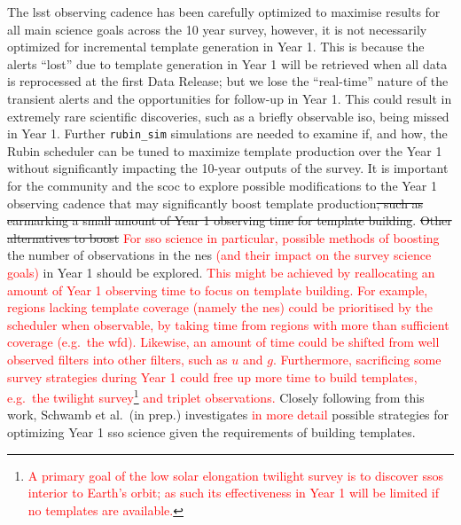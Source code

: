 \documentclass[preprintm,linenumbers]{aastex631}
\newcommand{\rubinsim}{\texttt{rubin\_sim}\xspace}
\providecommand{\red}[1]{\textcolor{red}{#1}}
\begin{document}
The \gls*{lsst} observing cadence has been carefully optimized to maximise results for all main science goals across the 10 year survey, however, it is not necessarily optimized for incremental template generation in Year 1.
  This is because the alerts ``lost'' due to template generation in Year 1 will be retrieved when all data is reprocessed at the first Data Release; but we lose the ``real-time'' nature of the transient alerts and the opportunities for follow-up in Year 1.
This could result in extremely rare scientific discoveries, such as a briefly observable \gls*{iso}, being missed in Year 1.
		Further \rubinsim simulations are needed to examine if, and how, the Rubin scheduler can be tuned to maximize template production over the Year 1 without significantly impacting the 10-year outputs of the survey. 
  It is important for the community and the \gls*{scoc} to explore possible modifications to the Year 1 observing cadence  that may significantly boost template production\sout{, such as earmarking a small amount of Year 1 observing time for template building}. 
\sout{Other alternatives to boost} \red{For \gls*{sso} science in particular, possible methods of boosting} the number of observations in the \gls*{nes} \red{(and their impact on the survey science goals)} in Year 1 should be explored. 
  \red{
  This might be achieved by reallocating an amount of Year 1 observing time to focus on template building. 
  For example, regions lacking template coverage (namely the \gls*{nes}) could be prioritised by the scheduler when observable, by taking time from regions with more than sufficient coverage (e.g.\ the \gls*{wfd}). 
  Likewise, an amount of time could be shifted from well observed filters into other filters, such as $u$ and $g$. 
  Furthermore, sacrificing some survey strategies during Year 1 could free up more time to build templates, e.g.\  the twilight survey\footnote{\red{A primary goal of the low solar elongation twilight survey is to discover \glspl*{sso} interior to Earth's orbit; as such its effectiveness in Year 1 will be limited if no templates are available.}} and triplet observations. }
Closely following from this work, Schwamb et al.\ (in prep.) investigates \red{in more detail} possible strategies for optimizing Year 1 \gls*{sso} science given the requirements of building templates.
\end{document}

